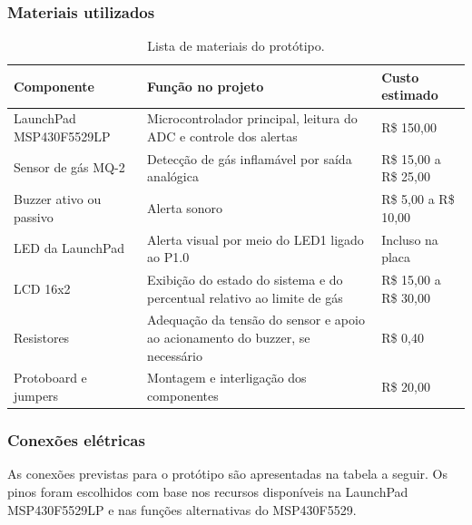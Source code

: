 \documentclass[11pt,a4paper]{article}
\numberwithin{equation}{section}
\begin{document}
\subsubsection{Materiais utilizados}

\setcounter{table}{0}
\renewcommand{\thetable}{3.\arabic{table}}

\begin{table}[htbp]
  \centering
  \small
  \begin{tabular}{@{}p{3.9cm}p{6.9cm}p{3.4cm}@{}}
    \toprule
    \textbf{Componente} & \textbf{Função no projeto} & \textbf{Custo estimado} \\
    \midrule
    LaunchPad MSP430F5529LP & Microcontrolador principal, leitura do ADC e controle dos alertas & R\$ 150,00 \\
    \addlinespace
    Sensor de gás MQ-2 & Detecção de gás inflamável por saída analógica & R\$ 15,00 a R\$ 25,00 \\
    \addlinespace
    Buzzer ativo ou passivo & Alerta sonoro & R\$ 5,00 a R\$ 10,00 \\
    \addlinespace
    LED da LaunchPad & Alerta visual por meio do LED1 ligado ao P1.0 & Incluso na placa \\
    \addlinespace
    LCD 16x2 & Exibição do estado do sistema e do percentual relativo ao limite de gás & R\$ 15,00 a R\$ 30,00 \\
    \addlinespace
    Resistores & Adequação da tensão do sensor e apoio ao acionamento do buzzer, se necessário & R\$ 0,40 \\
    \addlinespace
    Protoboard e jumpers & Montagem e interligação dos componentes & R\$ 20,00 \\
    \bottomrule
  \end{tabular}
  \caption{Lista de materiais do protótipo.}
  \label{tab:materiais}
\end{table}

\subsubsection{Conexões elétricas}

As conexões previstas para o protótipo são apresentadas na tabela a seguir. Os pinos foram escolhidos
com base nos recursos disponíveis na LaunchPad MSP430F5529LP e nas funções alternativas do
MSP430F5529.
\end{document}
